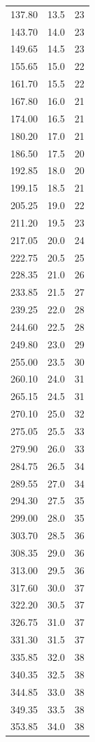 \documentclass[12pt]{report}
\begin{document}
\begin{small}
\begin{longtable}{S[table-format=3.2] S[table-format=2.1] S[table-format=2.0]}
137.80 & 13.5 & 23 \\
143.70 & 14.0 & 23 \\
149.65 & 14.5 & 23 \\
155.65 & 15.0 & 22 \\
161.70 & 15.5 & 22 \\
167.80 & 16.0 & 21 \\
174.00 & 16.5 & 21 \\
180.20 & 17.0 & 21 \\
186.50 & 17.5 & 20 \\
192.85 & 18.0 & 20 \\
199.15 & 18.5 & 21 \\
205.25 & 19.0 & 22 \\
211.20 & 19.5 & 23 \\
217.05 & 20.0 & 24 \\
222.75 & 20.5 & 25 \\
228.35 & 21.0 & 26 \\
233.85 & 21.5 & 27 \\
239.25 & 22.0 & 28 \\
244.60 & 22.5 & 28 \\
249.80 & 23.0 & 29 \\
255.00 & 23.5 & 30 \\
260.10 & 24.0 & 31 \\
265.15 & 24.5 & 31 \\
270.10 & 25.0 & 32 \\
275.05 & 25.5 & 33 \\
279.90 & 26.0 & 33 \\
284.75 & 26.5 & 34 \\
289.55 & 27.0 & 34 \\
294.30 & 27.5 & 35 \\
299.00 & 28.0 & 35 \\
303.70 & 28.5 & 36 \\
308.35 & 29.0 & 36 \\
313.00 & 29.5 & 36 \\
317.60 & 30.0 & 37 \\
322.20 & 30.5 & 37 \\
326.75 & 31.0 & 37 \\
331.30 & 31.5 & 37 \\
335.85 & 32.0 & 38 \\
340.35 & 32.5 & 38 \\
344.85 & 33.0 & 38 \\
349.35 & 33.5 & 38 \\
353.85 & 34.0 & 38 \\

\end{longtable}
\end{small}
\end{document}
